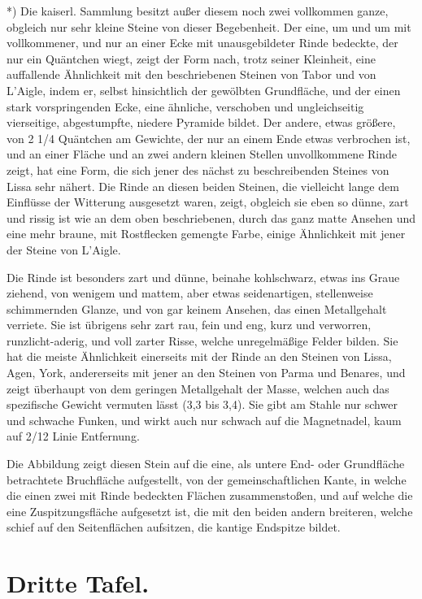 \documentclass[a4paper, 11pt, oneside, german]{article}
\begin{document}
*) Die kaiserl. Sammlung besitzt außer diesem noch zwei vollkommen ganze, obgleich nur sehr kleine Steine von dieser Begebenheit. Der eine, um und um mit vollkommener, und nur an einer Ecke mit unausgebildeter Rinde bedeckte, der nur ein Quäntchen wiegt, zeigt der Form nach, trotz seiner Kleinheit, eine auffallende Ähnlichkeit mit den beschriebenen Steinen von Tabor und von L'Aigle, indem er, selbst hinsichtlich der gewölbten Grundfläche, und der einen stark vorspringenden Ecke, eine ähnliche, verschoben und ungleichseitig vierseitige, abgestumpfte, niedere Pyramide bildet. Der andere, etwas größere, von 2 1/4 Quäntchen am Gewichte, der nur an einem Ende etwas verbrochen ist, und an einer Fläche und an zwei andern kleinen Stellen unvollkommene Rinde zeigt, hat eine Form, die sich jener des nächst zu beschreibenden Steines von Lissa sehr nähert. Die Rinde an diesen beiden Steinen, die vielleicht lange dem Einflüsse der Witterung ausgesetzt waren, zeigt, obgleich sie eben so dünne, zart und rissig ist wie an dem oben beschriebenen, durch das ganz matte Ansehen und eine mehr braune, mit Rostflecken gemengte Farbe, einige Ähnlichkeit mit jener der Steine von L'Aigle.

Die Rinde ist besonders zart und dünne, beinahe kohlschwarz, etwas ins Graue ziehend, von wenigem und mattem, aber etwas seidenartigen, stellenweise schimmernden Glanze, und von gar keinem Ansehen, das einen Metallgehalt verriete. Sie ist übrigens sehr zart rau, fein und eng, kurz und verworren, runzlicht-aderig, und voll zarter Risse, welche unregelmäßige Felder bilden. Sie hat die meiste Ähnlichkeit einerseits mit der Rinde an den Steinen von Lissa, Agen, York, andererseits mit jener an den Steinen von Parma und Benares, und zeigt überhaupt von dem geringen Metallgehalt der Masse, welchen auch das spezifische Gewicht vermuten lässt (3,3 bis 3,4). Sie gibt am Stahle nur schwer und schwache Funken, und wirkt auch nur schwach auf die Magnetnadel, kaum auf 2/12 Linie Entfernung.

Die Abbildung zeigt diesen Stein auf die eine, als untere End- oder Grundfläche betrachtete Bruchfläche aufgestellt, von der gemeinschaftlichen Kante, in welche die einen zwei mit Rinde bedeckten Flächen zusammenstoßen, und auf welche die eine Zuspitzungsfläche aufgesetzt ist, die mit den beiden andern breiteren, welche schief auf den Seitenflächen aufsitzen, die kantige Endspitze bildet.
\clearpage
\section{Dritte Tafel.}
\end{document}
